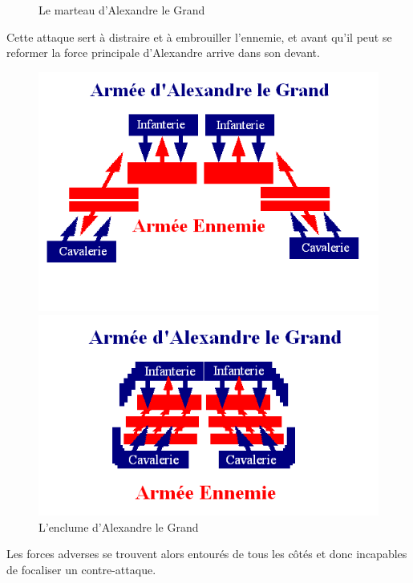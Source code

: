 \documentclass{article}
\begin{document}
\begin{center}
\begin{figure}[H]
\hfill
\caption{Le \og{}marteau\fg{} d'Alexandre le Grand}
\end{figure}
\cite{Alexanders_tactics}
Cette attaque sert à distraire et à embrouiller l'ennemie, et avant qu'il peut se reformer la force principale d'Alexandre arrive dans son devant.
\begin{figure}[H]
\hfill
\begin{minipage}[H]{0.5\linewidth}
	\centering
	\includegraphics[width=\linewidth]{../ressources/enclume}
\end{minipage}
\hfill
\begin{minipage}[H]{0.45\linewidth}
	\centering
	\includegraphics[width=\linewidth]{../ressources/enclume2}
\end{minipage}
\hfill
\caption{\og{}L'enclume\fg{} d'Alexandre le Grand}
\end{figure}
\cite{Alexanders_tactics}
\end{center}
Les forces adverses se trouvent alors entourés de tous les côtés et donc incapables de focaliser un contre-attaque.
\end{document}
